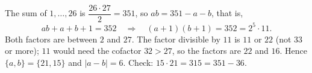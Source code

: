 The sum of $1,\dots,26$ is $\dfrac{26\cdot27}{2}=351$, so $ab=351-a-b$, that is,
\[
ab+a+b+1=352\quad\Longrightarrow\quad (a+1)(b+1)=352=2^5\cdot11 .
\]
Both factors are between $2$ and $27$. The factor divisible by $11$ is $11$ or $22$ (not $33$ or more); $11$ would need the cofactor $32>27$, so the factors are $22$ and $16$. Hence $\{a,b\}=\{21,15\}$ and $|a-b|=\boxed{6}$. Check: $15\cdot21=315=351-36$.
